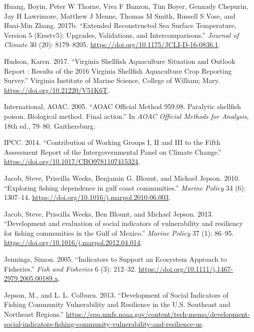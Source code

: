 \documentclass[
]{book}
\newlength{\cslhangindent}
\newenvironment{cslreferences}%
  {\setlength{\parindent}{0pt}%
  \everypar{\setlength{\hangindent}{\cslhangindent}}\ignorespaces}%
  {\par}
\begin{document}
\begin{cslreferences}
\leavevmode\hypertarget{ref-huang2017extended}{}%
Huang, Boyin, Peter W Thorne, Viva F Banzon, Tim Boyer, Gennady Chepurin, Jay H Lawrimore, Matthew J Menne, Thomas M Smith, Russell S Vose, and Huai-Min Zhang. 2017b. ``Extended Reconstructed Sea Surface Temperature, Version 5 (Ersstv5): Upgrades, Validations, and Intercomparisons.'' \emph{Journal of Climate} 30 (20): 8179--8205. \url{https://doi.org/10.1175/JCLI-D-16-0836.1}.

\leavevmode\hypertarget{ref-Hudson2017a}{}%
Hudson, Karen. 2017. ``Virginia Shellfish Aquaculture Situation and Outlook Report : Results of the 2016 Virginia Shellfish Aquaculture Crop Reporting Survey.'' Virginia Institute of Marine Science, College of William; Mary. \url{https://doi.org/10.21220/V51K6T}.

\leavevmode\hypertarget{ref-Anonymous2005}{}%
International, AOAC. 2005. ``AOAC Official Method 959.08. Paralytic shellfish poison. Biological method. Final action.'' In \emph{AOAC Official Methods for Analysis}, 18th ed., 79--80. Gaithersburg.

\leavevmode\hypertarget{ref-IPCC2014}{}%
IPCC. 2014. ``Contribution of Working Groups I, II and III to the Fifth Assessment Report of the Intergovernmental Panel on Climate Change.'' \url{https://doi.org/10.1017/CBO9781107415324}.

\leavevmode\hypertarget{ref-Jacob2010}{}%
Jacob, Steve, Priscilla Weeks, Benjamin G. Blount, and Michael Jepson. 2010. ``Exploring fishing dependence in gulf coast communities.'' \emph{Marine Policy} 34 (6): 1307--14. \url{https://doi.org/10.1016/j.marpol.2010.06.003}.

\leavevmode\hypertarget{ref-Jacob2013}{}%
Jacob, Steve, Priscilla Weeks, Ben Blount, and Michael Jepson. 2013. ``Development and evaluation of social indicators of vulnerability and resiliency for fishing communities in the Gulf of Mexico.'' \emph{Marine Policy} 37 (1): 86--95. \url{https://doi.org/10.1016/j.marpol.2012.04.014}.

\leavevmode\hypertarget{ref-jennings_indicators_2005}{}%
Jennings, Simon. 2005. ``Indicators to Support an Ecosystem Approach to Fisheries.'' \emph{Fish and Fisheries} 6 (3): 212--32. \url{https://doi.org/10.1111/j.1467-2979.2005.00189.x}.

\leavevmode\hypertarget{ref-Jepson2013}{}%
Jepson, M., and L. L. Colburn. 2013. ``Development of Social Indicators of Fishing Community Vulnerability and Resilience in the U.S. Southeast and Northeast Regions.'' \url{https://spo.nmfs.noaa.gov/content/tech-memo/development-social-indicators-fishing-community-vulnerability-and-resilience-us}.


\end{cslreferences}
\end{document}
